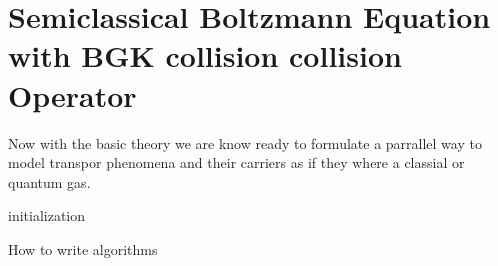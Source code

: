 %

\chapter{Semiclassical Boltzmann Equation with BGK collision collision Operator}

Now with the basic theory we are know ready to formulate a parrallel way to model transpor phenomena and their carriers as if they where a classial or quantum gas.

\begin{algorithm}[H]
 \SetLine
 initialization\;
 \caption{How to write algorithms}
\end{algorithm}

%
